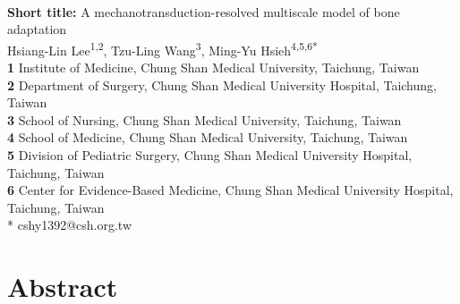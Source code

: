 \documentclass[10pt,letterpaper]{article}
\begin{document}
\vspace*{0.2in}

\begin{flushleft}
{\Large
\textbf{}
}
\newline
\\
\textbf{Short title:} A mechanotransduction-resolved multiscale model of bone adaptation
\newline
\\
Hsiang-Lin Lee\textsuperscript{1,2},
Tzu-Ling Wang\textsuperscript{3},
Ming-Yu Hsieh\textsuperscript{4,5,6*}
\\
\bigskip
\textbf{1} Institute of Medicine, Chung Shan Medical University, Taichung, Taiwan
\\
\textbf{2} Department of Surgery, Chung Shan Medical University Hospital, Taichung, Taiwan
\\
\textbf{3} School of Nursing, Chung Shan Medical University, Taichung, Taiwan
\\
\textbf{4} School of Medicine, Chung Shan Medical University, Taichung, Taiwan
\\
\textbf{5} Division of Pediatric Surgery, Chung Shan Medical University Hospital, Taichung, Taiwan
\\
\textbf{6} Center for Evidence-Based Medicine, Chung Shan Medical University Hospital, Taichung, Taiwan
\\
\bigskip
* cshy1392@csh.org.tw
\end{flushleft}

\section*{Abstract}
\end{document}
